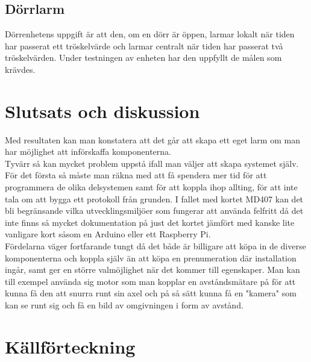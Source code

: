 \documentclass{article}
\begin{document}
\subsection{Dörrlarm}
Dörrenhetens uppgift är att den, om en dörr är öppen, larmar lokalt när tiden har passerat ett tröskelvärde och larmar centralt när tiden har passerat två tröskelvärden. Under testningen av enheten har den uppfyllt de målen som krävdes.


\section{Slutsats och diskussion}
Med resultaten kan man konstatera att det går att skapa ett eget larm om man har möjlighet att införskaffa komponenterna.\\

Tyvärr så kan mycket problem uppstå ifall man väljer att skapa systemet själv.
För det första så måste man räkna med att få spendera mer tid för att programmera de olika delsystemen samt för att koppla ihop allting, för att inte tala om att bygga ett protokoll från grunden.
I fallet med kortet MD407 kan det bli begränsande vilka utvecklingsmiljöer som fungerar att använda felfritt då det inte finns så mycket dokumentation på just det kortet jämfört med kanske lite vanligare kort såsom en Arduino eller ett Raspberry Pi.\\

Fördelarna väger fortfarande tungt då det både är billigare att köpa in de diverse komponenterna och koppla själv än att köpa en prenumeration där installation ingår, 
samt ger en större valmöjlighet när det kommer till egenskaper. 
Man kan till exempel använda sig motor som man kopplar en avståndsmätare på för att kunna få den att snurra runt sin axel och på så sätt kunna få en "kamera" som kan se runt sig och få en bild av omgivningen i form av avstånd.

\newpage
\section{Källförteckning}
\printbibliography[heading=none]
\end{document}
